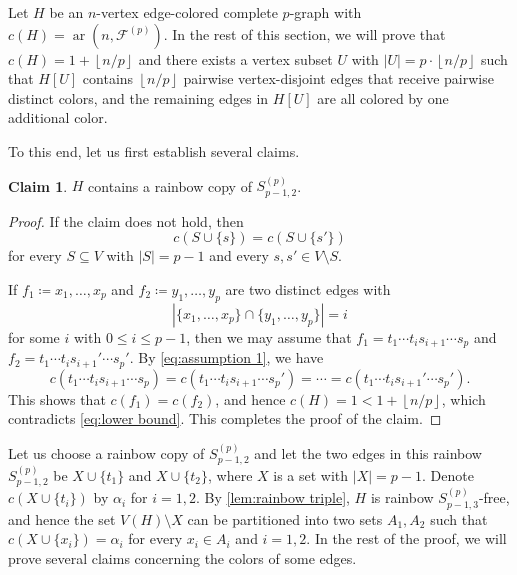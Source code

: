 \documentclass[10pt,a4paper]{article}
\theoremstyle{definition}
\newtheorem{claim}[theorem]{Claim}
\newcommand{\cF}{\mathcal{F}}
\newcommand{\floor}[1]{\left\lfloor #1 \right\rfloor}
\DeclareMathOperator{\ar}{ar}
\begin{document}
Let $H$ be an $n$-vertex edge-colored complete $p$-graph with $c(H)=\ar(n,\cF^{(p)})$.
In the rest of this section, we will prove that $c(H)=1+\floor{n/p}$ and there exists a vertex subset $U$ with $|U|=p\cdot \floor{n/p}$ such that $H[U]$ contains $\floor{n/p}$ pairwise vertex-disjoint edges that receive pairwise distinct colors, and the remaining edges in $H[U]$ are all colored by one additional color.


To this end, let us first establish several claims.

\medskip





\begin{claim}
    $H$ contains a rainbow copy of $S_{p-1,2}^{(p)}$.
\end{claim}

\begin{proof}
    If the claim does not hold, then
    \begin{equation}\label{eq:assumption 1}
        c(S\cup \{s\})=c(S\cup \{s'\})
    \end{equation}
    for every $S\subseteq V$ with $|S|=p-1$ and every $s,s'\in V\setminus S$.

    If $f_1 \coloneqq x_1,\ldots,x_p$ and $f_2 \coloneqq y_1,\ldots,y_p$ are two distinct edges with
    \[
        |\{x_1,\ldots,x_p\}\cap\{y_1,\ldots,y_p\}|=i
    \]
    for some $i$ with $0\le i\le p-1$, then we may assume that $f_1=t_1\cdots t_i s_{i+1}\cdots s_p$ and $f_2=t_1\cdots t_i s_{i+1}'\cdots s_p'$.
    By \cref{eq:assumption 1}, we have
    \[
        c(t_1\cdots t_{i} s_{i+1}\cdots s_p)=c(t_1\cdots t_{i} s_{i+1}\cdots s_p')=\cdots=c(t_1\cdots t_{i} s_{i+1}'\cdots s_p').
    \]
    This shows that $c(f_1)=c(f_2)$, and hence $c(H)=1<1+\floor{n/p}$, which contradicts \cref{eq:lower bound}.
    This completes the proof of the claim.
\end{proof}

Let us choose a rainbow copy of $S_{p-1,2}^{(p)}$ and let the two edges in this rainbow $S_{p-1,2}^{(p)}$ be $X\cup\{t_1\}$ and $X\cup\{t_2\}$, where $X$ is a set with $|X|=p-1$.
Denote $c(X\cup\{t_i\})$ by $\alpha_i$ for $i=1,2$.
By \cref{lem:rainbow triple}, $H$ is rainbow $S_{p-1,3}^{(p)}$-free, and hence the set $V(H)\setminus X$ can be partitioned into two sets $A_1,A_2$ such that $c(X\cup\{x_i\})=\alpha_i$ for every $x_i\in A_i$ and $i=1,2$.
In the rest of the proof, we will prove several claims concerning the colors of some edges.
\end{document}
